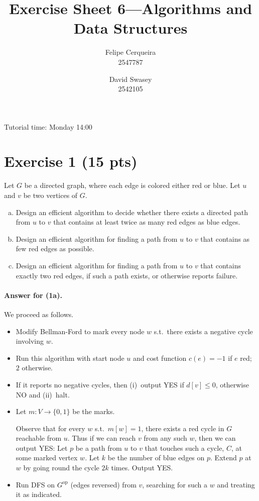 \documentclass[a4paper]{article}
\title{Exercise Sheet 6---Algorithms and Data Structures}
\author{Felipe Cerqueira \\ 2547787 \and David Swasey \\ 2542105}
\begin{document}
\maketitle

Tutorial time: Monday 14:00

\section*{Exercise 1 (15 pts)}

Let $G$ be a directed graph, where each edge is colored either red or blue.
Let $u$ and $v$ be two vertices of $G$.
\begin{enumerate}[a)]
	\item Design an efficient algorithm to decide whether there exists a directed path from $u$ to $v$ that contains at least twice as many red edges as blue edges.
	
	\item Design an efficient algorithm for finding a path from $u$ to $v$ that contains as few red edges as possible.
	
	\item Design an efficient algorithm for finding a path from $u$ to $v$ that contains exactly two red edges, if such a path exists, or otherwise reports failure.
\end{enumerate}

\paragraph{Answer for (1a).}
We proceed as follows.
\begin{itemize}
	\item
	Modify Bellman-Ford to mark every node $w$ s.t.\ there exists a negative cycle involving $w$.
	
	\item
	Run this algorithm with start node $u$ and cost function $c(e) = -1$ if $e$ red; $2$ otherwise.
	
	\item
	If it reports no negative cycles, then (i)~output YES if $d[v] \le 0$, otherwise NO and (ii)~halt.
	
	\item
	Let  $m : V \to \{0,1\}$ be the marks.
	
	Observe that for every $w$ s.t.\ $m[w] = 1$, there exists a red cycle in $G$ reachable from $u$.
	Thus if we can reach $v$ from any such $w$, then we can output YES: Let $p$ be a path from $u$ to $v$ that touches such a cycle, $C$, at some marked vertex $w$.
	Let $k$ be the number of blue edges on $p$.
	Extend $p$ at $w$ by going round the cycle $2k$ times.
	Output YES.

	\item
	Run DFS on $G^\text{op}$ (edges reversed) from $v$, searching for such a $w$ and treating it as indicated.

\end{itemize}
\end{document}

